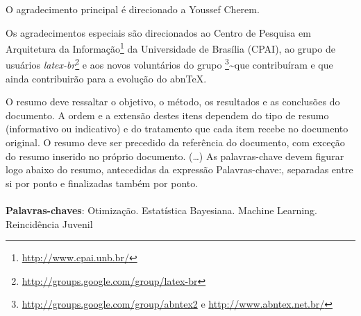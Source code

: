 \documentclass[
	12pt,				%
	a4paper,		%
	oneside,    %
	chapter=TITLE,		   %
	section=TITLE,		   %
	subsection=TITLE,	   %
	subsubsection=TITLE, %
	english,			%
	french,				%
	spanish,			%
	brazil,				%
]{abntex2}
\begin{document}
\pretextual

\makeindex

\imprimircapa

\imprimirfolhaderosto*


\imprimitfolhadeaprovacao

\begin{agradecimentos}
  O agradecimento principal é direcionado a Youssef Cherem.
  
  Os agradecimentos especiais são direcionados ao Centro de Pesquisa em
  Arquitetura da Informação\footnote{\url{http://www.cpai.unb.br/}} da
  Universidade de Brasília (CPAI), ao grupo de usuários
  \emph{latex-br}\footnote{\url{http://groups.google.com/group/latex-br}}
  e aos novos voluntários do grupo
  \emph{\abnTeX}\footnote{\url{http://groups.google.com/group/abntex2} e
  \url{http://www.abntex.net.br/}}\textasciitilde{}que contribuíram e que
  ainda contribuirão para a evolução do abn\TeX.
\end{agradecimentos}


\setlength{\absparsep}{18pt} %
\begin{resumo}
 O resumo deve ressaltar o objetivo, o método, os resultados e as
 conclusões do documento. A ordem e a extensão destes itens dependem do
 tipo de resumo (informativo ou indicativo) e do tratamento que cada item
 recebe no documento original. O resumo deve ser precedido da referência
 do documento, com exceção do resumo inserido no próprio documento.
 (\ldots) As palavras-chave devem figurar logo abaixo do resumo,
 antecedidas da expressão Palavras-chave:, separadas entre si por ponto e
 finalizadas também por ponto.
 \noindent
 \\
 \\
 \textbf{Palavras-chaves}: Otimização. Estatística Bayesiana. Machine Learning. Reincidência
Juvenil
\end{resumo}

\listoffigures*
\clearpage
\end{document}
